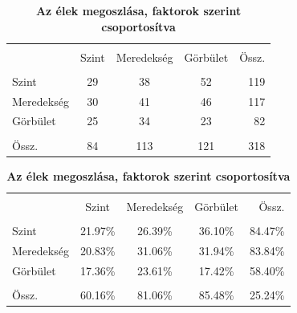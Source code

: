\documentclass[12pt,bibliography=totoc]{article}
\begin{document}
\begin{table}[H]
\caption{A hálózatban definiált szignifikáns élek száma és megoszlása} %
\fontsize{9}{9}\selectfont
\centering
\begin{subtable}[t]{0.35\textwidth}
\centering
\begin{tabular}{l | ccc  r}%
\hline\hline \\ [-1.5ex]                         %

	&	Szint	&	Meredekség	&	Görbület	& Össz.  \\ 
\hline \\ [-1.5ex]  
Szint	&	29	&	38	&	52	&	119 	\\
Meredekség	&	30	&	41	&	46	&	117	\\
Görbület	&	25	&	34	&	23	&	82	\\
\hline \\ [-1.5ex]  
Össz.	&	84	&	113	&	121	&	318	\\


\hline            
\end{tabular}
\caption{\textbf{Az élek száma, faktorok szerint csoportosítva}}
\end{subtable}
\hspace{\fill}
\begin{subtable}[t]{0.5\textwidth}
\centering
\begin{tabular}{l | ccc  r}%
\hline\hline \\ [-1.5ex]                         %



	&	Szint	&	Meredekség	&	Görbület	&	Össz.	\\
\hline \\ [-1.5ex] 
Szint	&	21.97\%	&	26.39\%	&	36.10\%	&	84.47\%	\\
Meredekség	&	20.83\%	&	31.06\%	&	31.94\%	&	83.84\%	\\
Görbület	&17.36\%	&	23.61\%	&	17.42\%	&	58.40\%	\\
\hline \\ [-1.5ex]  
Össz.	&	60.16\%	&	81.06\%	&	85.48\%	&	25.24\%	\\
\hline  
\end{tabular}
\caption{\textbf{Az élek megoszlása, faktorok szerint csoportosítva}}
\end{subtable}

\end{table}
\end{document}
